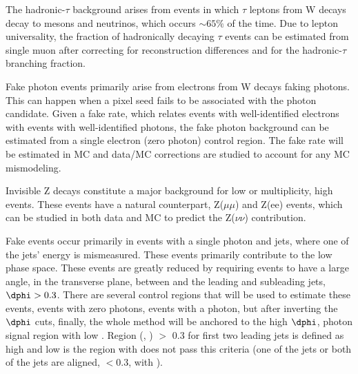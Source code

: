 The hadronic-$\tau$ background arises from events in which $\tau$ leptons from 
W decays decay to mesons and neutrinos, which occurs $\sim 65\%$ of the time.  
Due to lepton universality, the fraction of hadronically decaying $\tau$ events 
can be estimated from single muon after correcting for reconstruction differences
and for the hadronic-$\tau$ branching fraction.  

Fake photon events primarily arise from electrons from W decays faking 
photons.  This can happen when a pixel seed fails to be associated with
the photon candidate.  Given a fake rate, which relates events with well-identified
electrons with events with well-identified photons, the fake photon background
can be estimated from a single electron (zero photon) control region.  The 
fake rate will be estimated in MC and data/MC corrections are studied to 
account for any MC mismodeling.

Invisible Z decays constitute a major background for low \nb or \nj multiplicity, high 
\ptmiss events.  These events have a natural counterpart, Z($\mu\mu$) and Z(ee)
events, which can be studied in both data and MC to predict the Z($\nu\nu$) 
contribution.

Fake \ptmiss events occur primarily in events with a single photon and jets, 
where one of the jets' energy is mismeasured.  These events primarily
contribute to the low \ptmiss phase space.  These events are greatly reduced
by requiring events to have a large angle, in the transverse plane, between
\ptmiss and the leading and subleading jets, $\dphi>0.3$.  There are several control 
regions that will be used to estimate these events, events with zero photons, 
events with a photon, but after inverting the $\dphi$ cuts, 
finally, the whole method will be anchored to the high $\dphi$, photon
signal region with low \ptmiss. Region \dphi(\ptvecmiss, \ptvecjet) $>$ 0.3 for first two leading jets is defined as
high \dphi and low \dphi is the region with does not pass this criteria (one of the jets or both of the jets are aligned, \dphi$<$0.3, with \ptmiss).




